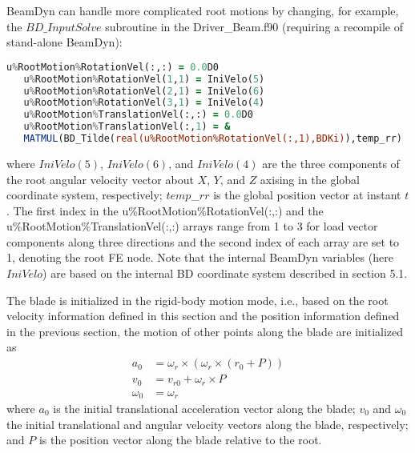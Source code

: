 BeamDyn can handle more complicated root motions by changing, for example, the $BD\_InputSolve$ subroutine in the Driver\_Beam.f90  (requiring a recompile of stand-alone BeamDyn):
\begin{lstlisting}[frame=single,language=Fortran]
   u%RootMotion%RotationVel(:,:) = 0.0D0
   u%RootMotion%RotationVel(1,1) = IniVelo(5)
   u%RootMotion%RotationVel(2,1) = IniVelo(6)
   u%RootMotion%RotationVel(3,1) = IniVelo(4)
   u%RootMotion%TranslationVel(:,:) = 0.0D0
   u%RootMotion%TranslationVel(:,1) = &
   MATMUL(BD_Tilde(real(u%RootMotion%RotationVel(:,1),BDKi)),temp_rr)
\end{lstlisting}
where $IniVelo(5)$, $IniVelo(6)$, and $IniVelo(4)$ are the three components of the root angular velocity vector about  $X$, $Y$, and $Z$ axising in the global coordinate system, respectively; $temp$\_$rr$ is the global position vector at instant $t$. The first index in the u\%RootMotion\%RotationVel(:,:) and the u\%RootMotion\%TranslationVel(:,:) arrays range from 1 to 3 for load vector components along three directions and the second index of each array are set to 1, denoting the root FE node. Note that the internal BeamDyn variables (here $IniVelo$) are based on the internal BD coordinate system described in section 5.1.


The blade is initialized in the rigid-body motion mode, i.e., based on the root velocity information defined in this section and the position information defined in the previous section, the motion of other points along the blade are initialized as
\begin{align}
    \label{IniRootAcc}
    a_{0} &= \omega_r \times (\omega_r \times (r_0 + P)) \\
    \label{IniTraVel}
    v_0 &= v_{r0} + \omega_r \times P \\
    \label{IniAngVel}
    \omega_0 &= \omega_r
\end{align}
where $a_{0}$ is the initial translational acceleration vector along the blade; $v_0$ and $\omega_0$ the initial translational and angular velocity vectors along the blade, respectively; and $P$ is the position vector along the blade relative to the root. 

